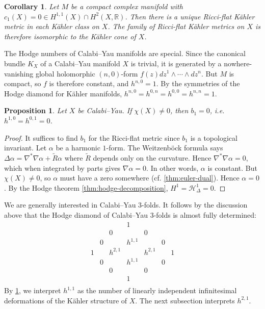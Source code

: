 \documentclass{report}
\theoremstyle{plain}
\newtheorem{proposition}[theorem]{Proposition}
\newtheorem{corollary}[theorem]{Corollary}
\theoremstyle{definition}
\theoremstyle{remark}
\newcommand{\bR}{\mathbb{R}}
\newcommand{\cH}{\mathcal{H}}
\begin{document}
\begin{corollary} \label{thm:h11-kahler-deformation}
  Let $M$ be a compact complex manifold with $c_1(X) = 0 \in
  H^{1,1}(X) \cap H^2(X, \bR)$. Then there is a unique Ricci-flat
  K\"ahler metric in each K\"ahler class on $X$. The family of
  Ricci-flat K\"ahler metrics on $X$ is therefore isomorphic to the
  K\"ahler cone of $X$.
\end{corollary}

The Hodge numbers of Calabi--Yau manifolds are special. Since the
canonical bundle $K_X$ of a Calabi--Yau manifold $X$ is trivial, it is
generated by a nowhere-vanishing global holomorphic $(n,0)$-form $f(z)
dz^1 \wedge \cdots \wedge dz^n$. But $M$ is compact, so $f$ is
therefore constant, and $h^{n,0} = 1$. By the symmetries of the Hodge
diamond for K\"ahler manifolds, $h^{n,0} = h^{0,n} = h^{0,0} = h^{n,n}
= 1$.

\begin{proposition}
  Let $X$ be Calabi--Yau. If $\chi(X) \neq 0$, then $b_1 = 0$,
  i.e. $h^{1,0} = h^{0,1} = 0$.
\end{proposition}

\begin{proof}
  It suffices to find $b_1$ for the Ricci-flat metric since $b_1$ is a
  topological invariant. Let $\alpha$ be a harmonic $1$-form. The
  Weitzenb\"ock formula says $\Delta \alpha = \nabla^*\nabla\alpha +
  \tilde{R}\alpha$ where $\tilde{R}$ depends only on the curvature.
  Hence $\nabla^*\nabla\alpha = 0$, which when integrated by parts
  gives $\nabla\alpha = 0$. In other words, $\alpha$ is constant. But
  $\chi(X) \neq 0$, so $\alpha$ must have a zero somewhere (cf.
  \ref{thm:euler-dual}). Hence $\alpha = 0$. By the Hodge theorem
  \ref{thm:hodge-decomposition}, $H^1 = \cH^1_{\Delta} = 0$.
\end{proof}

We are generally interested in Calabi--Yau $3$-folds. It follows by
the discussion above that the Hodge diamond of Calabi--Yau $3$-folds
is almost fully determined:
\[ \begin{array}{ccccccc}
  & && 1 && & \\
  && 0 && 0 && \\
  & 0 && h^{1,1} && 0 & \\
  1 && h^{2,1} && h^{2,1} && 1 \\
  & 0 && h^{1,1} && 0 & \\
  && 0 && 0 && \\
  & && 1 && & \\
\end{array} \]
By \ref{thm:h11-kahler-deformation}, we interpret $h^{1,1}$ as the
number of linearly independent infinitesimal deformations of the
K\"ahler structure of $X$. The next subsection interprets $h^{2,1}$.
\end{document}
